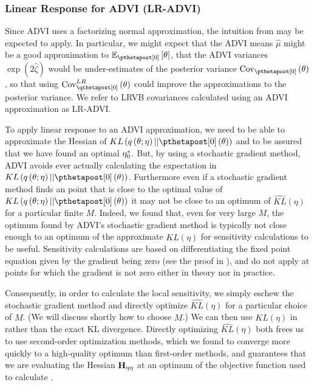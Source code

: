 \documentclass{article}\usepackage[]{graphicx}\usepackage[]{color}
\theoremstyle{definition}
\theoremstyle{plain}
\theoremstyle{plain}
\theoremstyle{plain}
\theoremstyle{definition}
\theoremstyle{plain}
\theoremstyle{plain}
\begin{document}
\subsubsection{Linear Response for ADVI (LR-ADVI)}

Since ADVI uses a factorizing normal approximation, the intuition
from  may be expected to apply.
In particular, we might expect that the ADVI means $\hat{\mu}$ might
be a good approximation to $\mbe_{\pzeropost}\left[\theta\right]$,
that the ADVI variances $\exp\left(2\hat{\zeta}\right)$ would be
under-estimates of the posterior variance $\pcov\left(\theta\right)$,
so that using $\lrvbcov\left(\theta\right)$ could improve the approximations
to the posterior variance.  We refer to LRVB covariances calculated using
an ADVI approximation as LR-ADVI.

To apply linear response to an ADVI approximation, we need to be able to
approximate the Hessian of
$KL\left(q\left(\theta;\eta\right)||\pzeropost\left(\theta\right)\right)$ and to
be assured that we have found an optimal $\eta_{0}^{*}$. But, by using a
stochastic gradient method, ADVI avoids ever actually calculating the
 expectation in
$KL\left(q\left(\theta;\eta\right)||\pzeropost\left(\theta\right)\right)$.
Furthermore even if a stochastic gradient method finds an point that is close
to the optimal value of
$KL\left(q\left(\theta;\eta\right)||\pzeropost\left(\theta\right)\right)$ it may
not be close to an optimum of $\widehat{KL}\left(\eta\right)$ for a particular
finite $M$. Indeed, we found that, even for very large $M$, the
optimum found by ADVI's stochastic gradient method is typically not close enough
to an optimum of the approximate $\widehat{KL}\left(\eta\right)$ for sensitivity
calculations to be useful. Sensitivity calculations are based on differentiating
the fixed point equation given by the gradient being zero (see the proof in
), and do not apply at points for which the gradient is not
zero either in theory nor in practice.

Consequently, in order to calculate the local sensitivity, we simply eschew the
stochastic gradient method and directly optimize $\widehat{KL}\left(\eta\right)$
for a particular choice of $M$. (We will discuss shortly how to choose $M$.) We
can then use $\widehat{KL}\left(\eta\right)$ in 
rather than the exact KL divergence. Directly optimizing
$\widehat{KL}\left(\eta\right)$ both frees us to use
second-order optimization methods, which we found to converge more quickly to a
high-quality optimum than first-order methods, and guarantees that we are
evaluating the Hessian $\mathbf{H}_{\eta\eta}$ at an optimum of the objective function used to
calculate .
\end{document}
